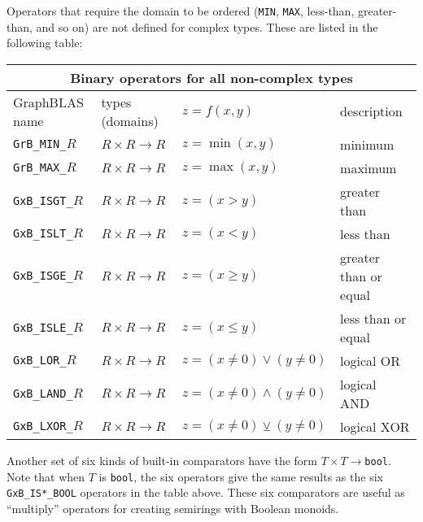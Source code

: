 \documentclass[12pt]{article}
\begin{document}
{Operators that require the domain to be ordered (\verb'MIN', \verb'MAX',
less-than, greater-than, and so on) are not defined for
complex types.  These are listed in the following table:

\vspace{0.2in}
{\footnotesize
\begin{tabular}{|llll|}
\hline
\multicolumn{4}{|c|}{Binary operators for all non-complex types} \\
\hline
GraphBLAS name        & types (domains)            & $z=f(x,y)$      & description \\
\hline
\verb'GrB_MIN_'$R$    & $R \times R \rightarrow R$ & $z = \min(x,y)$ & minimum \\
\verb'GrB_MAX_'$R$    & $R \times R \rightarrow R$ & $z = \max(x,y)$ & maximum \\
\hline
\verb'GxB_ISGT_'$R$   & $R \times R \rightarrow R$ & $z = (x >   y)$ & greater than \\
\verb'GxB_ISLT_'$R$   & $R \times R \rightarrow R$ & $z = (x <   y)$ & less than  \\
\verb'GxB_ISGE_'$R$   & $R \times R \rightarrow R$ & $z = (x \ge y)$ & greater than or equal \\
\verb'GxB_ISLE_'$R$   & $R \times R \rightarrow R$ & $z = (x \le y)$ & less than or equal  \\
\hline
\verb'GxB_LOR_'$R$    & $R \times R \rightarrow R$ & $z = (x \ne 0) \vee    (y \ne 0) $ & logical OR \\
\verb'GxB_LAND_'$R$   & $R \times R \rightarrow R$ & $z = (x \ne 0) \wedge  (y \ne 0) $ & logical AND \\
\verb'GxB_LXOR_'$R$   & $R \times R \rightarrow R$ & $z = (x \ne 0) \veebar (y \ne 0) $ & logical XOR \\
\hline
\end{tabular}
}
\vspace{0.2in}

Another set of six kinds of built-in comparators have the form $T
\times T \rightarrow $\verb'bool'.  Note that when $T$ is \verb'bool', the six
operators give the same results as the six \verb'GxB_IS*_BOOL' operators in the
table above.  These six comparators are useful as ``multiply''
operators for creating semirings with Boolean monoids.

}
\end{document}
